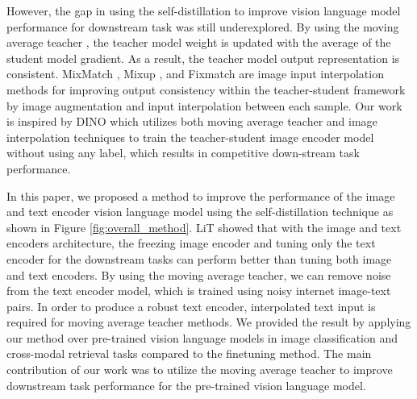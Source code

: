 \documentclass[10pt,twocolumn,letterpaper]{article}
\begin{document}
However, the gap in using the self-distillation to improve vision language model performance for downstream task was still underexplored. 
By using the moving average teacher \cite{mean_teacher,eman}, the teacher model weight is updated with the average of the student model gradient. 
As a result, the teacher model output representation is consistent.
MixMatch \cite{mixmatch}, Mixup \cite{mixup}, and Fixmatch \cite{fixmatch} are image input interpolation methods for improving output consistency within the teacher-student framework by image augmentation and input interpolation between each sample.
Our work is inspired by DINO \cite{dino} which utilizes both moving average teacher and image interpolation techniques to train the teacher-student image encoder model without using any label, which results in competitive down-stream task performance.

In this paper, we proposed a method to improve the performance of the image and text encoder vision language model using the self-distillation \cite{mean_teacher} technique as shown in Figure \ref{fig:overall_method}.
LiT \cite{lit} showed that with the image and text encoders architecture, the freezing image encoder and tuning only the text encoder for the downstream tasks can perform better than tuning both image and text encoders.
By using the moving average teacher, we can remove noise from the text encoder model, which is trained using noisy internet image-text pairs.
In order to produce a robust text encoder, interpolated text input is required for moving average teacher methods.
We provided the result by applying our method over pre-trained vision language models in image classification and cross-modal retrieval tasks compared to the finetuning method.
The main contribution of our work was to utilize the moving average teacher to improve downstream task performance for the pre-trained vision language model.
\end{document}
